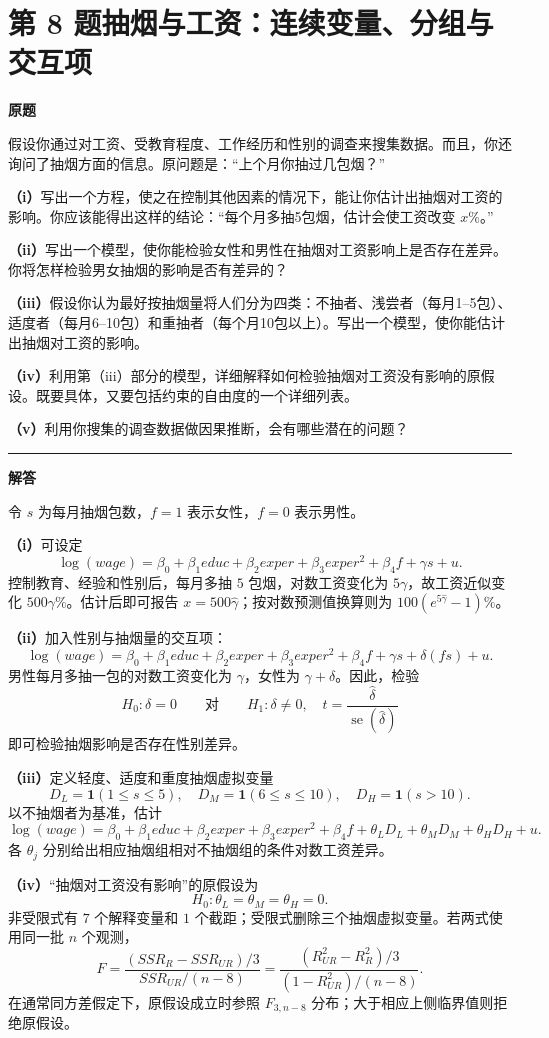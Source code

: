 \documentclass[UTF8,a4paper,11pt,fontset=fandol]{ctexart}
\newcommand{\vr}[1]{\mathit{#1}}
\newcommand{\se}{\operatorname{se}}
\newcommand{\subq}[1]{\par\medskip\noindent\textbf{（#1）}\enspace}
\newcommand{\question}[2]{\def\currentquestiontitle{第 #1 题\quad #2}}
\newenvironment{originalquestion}{%
  \par\medskip\noindent\begin{minipage}{\linewidth}
  \section*{\currentquestiontitle}
  \par\smallskip\noindent\textbf{原题}\par\smallskip
  \begingroup\small\setlength{\parskip}{2.5pt}%
}{%
  \par\endgroup\end{minipage}\par\medskip\Needspace{6\baselineskip}
  \noindent\rule{\linewidth}{0.35pt}\par\smallskip
  \noindent\textbf{解答}\par
}
\begin{document}
\question{8}{抽烟与工资：连续变量、分组与交互项}
\begin{originalquestion}
假设你通过对工资、受教育程度、工作经历和性别的调查来搜集数据。而且，你还询问了抽烟方面的信息。原问题是：“上个月你抽过几包烟？”

\subq{i}写出一个方程，使之在控制其他因素的情况下，能让你估计出抽烟对工资的影响。你应该能得出这样的结论：“每个月多抽5包烟，估计会使工资改变 $x\%$。”

\subq{ii}写出一个模型，使你能检验女性和男性在抽烟对工资影响上是否存在差异。你将怎样检验男女抽烟的影响是否有差异的？

\subq{iii}假设你认为最好按抽烟量将人们分为四类：不抽者、浅尝者（每月1--5包）、适度者（每月6--10包）和重抽者（每个月10包以上）。写出一个模型，使你能估计出抽烟对工资的影响。

\subq{iv}利用第（iii）部分的模型，详细解释如何检验抽烟对工资没有影响的原假设。既要具体，又要包括约束的自由度的一个详细列表。

\subq{v}利用你搜集的调查数据做因果推断，会有哪些潜在的问题？
\end{originalquestion}

令 $s$ 为每月抽烟包数，$f=1$ 表示女性，$f=0$ 表示男性。

\subq{i}可设定
\[
\log(\vr{wage})=\beta_0+\beta_1\vr{educ}
+\beta_2\vr{exper}+\beta_3\vr{exper}^2+\beta_4 f+\gamma s+u.
\]
控制教育、经验和性别后，每月多抽 $5$ 包烟，对数工资变化为 $5\gamma$，故工资近似变化 $500\gamma\%$。估计后即可报告 $x=500\widehat\gamma$；按对数预测值换算则为 $100(e^{5\widehat\gamma}-1)\%$。

\subq{ii}加入性别与抽烟量的交互项：
\[
\log(\vr{wage})=\beta_0+\beta_1\vr{educ}
+\beta_2\vr{exper}+\beta_3\vr{exper}^2+\beta_4 f
+\gamma s+\delta(f s)+u.
\]
男性每月多抽一包的对数工资变化为 $\gamma$，女性为 $\gamma+\delta$。因此，检验
\[
H_0:\delta=0\qquad\text{对}\qquad H_1:\delta\ne0,
\quad
t=\frac{\widehat\delta}{\se(\widehat\delta)}
\]
即可检验抽烟影响是否存在性别差异。

\subq{iii}定义轻度、适度和重度抽烟虚拟变量
\[
D_L=\mathbf1(1\le s\le5),\quad
D_M=\mathbf1(6\le s\le10),\quad
D_H=\mathbf1(s>10).
\]
以不抽烟者为基准，估计
\[
\log(\vr{wage})=\beta_0+\beta_1\vr{educ}
+\beta_2\vr{exper}+\beta_3\vr{exper}^2+\beta_4 f
+\theta_LD_L+\theta_MD_M+\theta_HD_H+u.
\]
各 $\theta_j$ 分别给出相应抽烟组相对不抽烟组的条件对数工资差异。

\subq{iv}“抽烟对工资没有影响”的原假设为
\[
H_0:\theta_L=\theta_M=\theta_H=0.
\]
非受限式有 $7$ 个解释变量和 $1$ 个截距；受限式删除三个抽烟虚拟变量。若两式使用同一批 $n$ 个观测，
\[
F=\frac{(SSR_R-SSR_{UR})/3}{SSR_{UR}/(n-8)}
 =\frac{(R_{UR}^2-R_R^2)/3}{(1-R_{UR}^2)/(n-8)}.
\]
在通常同方差假定下，原假设成立时参照 $F_{3,n-8}$ 分布；大于相应上侧临界值则拒绝原假设。
\end{document}
